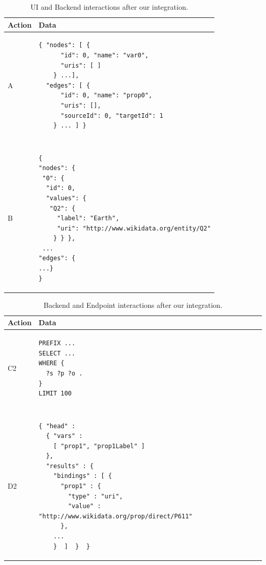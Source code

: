 \begin{table}[h]
\centering
\begin{tabular}{ll}
Action & Data \\ 
\hline
A              
& \begin{minipage}[t]{0.85\linewidth}
\begin{verbatim}
{ "nodes": [ {
      "id": 0, "name": "var0",
      "uris": [ ]
    } ...],
  "edges": [ {
      "id": 0, "name": "prop0",
      "uris": [],
      "sourceId": 0, "targetId": 1
    } ... ] }

\end{verbatim}
\end{minipage}
\\ \\ \\
B             
& \begin{minipage}[t]{0.85\linewidth}
\begin{verbatim}
{
"nodes": {
 "0": {
  "id": 0, 
  "values": {
   "Q2": {
     "label": "Earth",
     "uri": "http://www.wikidata.org/entity/Q2"
    } } },
 ...  
"edges": {
...}
} 
\end{verbatim}
\end{minipage}
\\
\end{tabular}
\caption{UI and Backend interactions after our integration.}
\label{table:uiAfterRequest1}
\end{table}


\begin{table}[h]
\centering
\begin{tabular}{ll}
Action & Data \\ 
\hline
C2             
& \begin{minipage}[t]{0.85\linewidth}
\begin{verbatim}
PREFIX ...
SELECT ... 
WHERE {
  ?s ?p ?o .
} 
LIMIT 100
\end{verbatim}
\end{minipage}
\\ \\ \\
D2             
& \begin{minipage}[t]{0.85\linewidth}
\begin{verbatim}
{ "head" : 
  { "vars" : 
    [ "prop1", "prop1Label" ] 
  },
  "results" : {
    "bindings" : [ {
      "prop1" : {
        "type" : "uri",
        "value" : "http://www.wikidata.org/prop/direct/P611"
      }, 
    ...
    }  ]  }  }
\end{verbatim}
\end{minipage}
\\
\end{tabular}
\caption{Backend and Endpoint interactions after our integration.}
\label{table:uiAfterRequest2}
\end{table}

